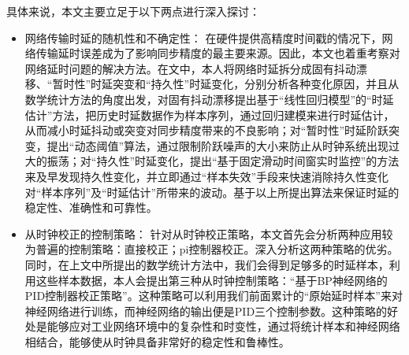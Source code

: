 具体来说，本文主要立足于以下两点进行深入探讨：
\begin{itemize}[noitemsep,topsep=0pt,parsep=0pt,partopsep=0pt]
	\item 网络传输时延的随机性和不确定性：
在硬件提供高精度时间戳的情况下，网络传输延时误差成为了影响同步精度的最主要来源。因此，本文也着重考察对网络延时问题的解决方法。在文中，本人将网络时延拆分成固有抖动漂移、“暂时性”时延突变和“持久性”时延变化，分别分析各种变化原因，并且从数学统计方法的角度出发，对固有抖动漂移提出基于“线性回归模型”的“时延估计”方法，把历史时延数据作为样本序列，通过回归建模来进行时延估计，从而减小时延抖动或突变对同步精度带来的不良影响；对“暂时性”时延阶跃突变，提出“动态阈值”算法，通过限制阶跃噪声的大小来防止从时钟系统出现过大的振荡；对“持久性”时延变化，提出“基于固定滑动时间窗实时监控”的方法来及早发现持久性变化，并立即通过“样本失效”手段来快速消除持久性变化对“样本序列”及“时延估计”所带来的波动。基于以上所提出算法来保证时延的稳定性、准确性和可靠性。
	\item 从时钟校正的控制策略：
针对从时钟校正策略，本文首先会分析两种应用较为普遍的控制策略：直接校正；pi控制器校正。深入分析这两种策略的优劣。同时，在上文中所提出的数学统计方法中，我们会得到足够多的时延样本，利用这些样本数据，本人会提出第三种从时钟控制策略：“基于BP神经网络的PID控制器校正策略”。这种策略可以利用我们前面累计的“原始延时样本”来对神经网络进行训练，而神经网络的输出便是PID三个控制参数。这种策略的好处是能够应对工业网络环境中的复杂性和时变性，通过将统计样本和神经网络相结合，能够使从时钟具备非常好的稳定性和鲁棒性。
\end{itemize}

